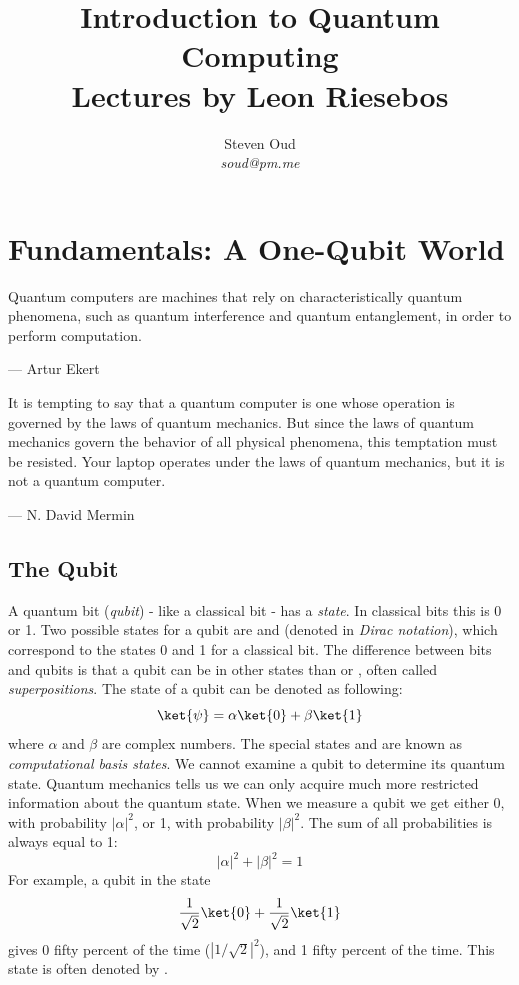 \documentclass[11pt, notitlepage]{report}
\title{\textbf{Introduction to Quantum Computing \\
\large Lectures by Leon Riesebos}}
\author{Steven Oud \\ \emph{soud@pm.me}}
\makeatletter
\newcommand*{\toccontents}{\@starttoc{toc}}
\makeatother
\begin{document}
\vfill
\maketitle

\toccontents

\newpage

\chapter{Fundamentals: A One-Qubit World}
\epigraph{Quantum computers are machines that rely on characteristically quantum phenomena, such as quantum interference and quantum entanglement, in order to perform computation.}{--- Artur Ekert}

\epigraph{It is tempting to say that a quantum computer is one whose operation is governed by the laws of quantum mechanics. But since the laws of quantum mechanics govern the behavior of all physical phenomena, this temptation must be resisted. Your laptop operates under the laws of quantum mechanics, but it is not a quantum computer.}{--- N. David Mermin}

\section{The Qubit}
A quantum bit (\emph{qubit}) - like a classical bit - has a \emph{state}. In classical bits this is 0 or 1. Two possible states for a qubit are  and  (denoted in \emph{Dirac notation}), which correspond to the states 0 and 1 for a classical bit. The difference between bits and qubits is that a qubit can be in other states than  or , often called \emph{superpositions}. The state of a qubit can be denoted as following:
\[\ket{\psi} = \alpha\ket{0} + \beta\ket{1}\]
where $\alpha$ and $\beta$ are complex numbers. The special states  and  are known as \emph{computational basis states}. We cannot examine a qubit to determine its quantum state. Quantum mechanics tells us we can only acquire much more restricted information about the quantum state. When we measure a qubit we get either 0, with probability $|\alpha|^2$, or 1, with probability $|\beta|^2$. The sum of all probabilities is always equal to 1:
\[|\alpha|^2 + |\beta|^2 = 1\]
For example, a qubit in the state
\[
\dfrac{1}{\sqrt2}\ket{0}+\dfrac{1}{\sqrt2}\ket{1}
\]
gives 0 fifty percent of the time ($|1/\sqrt2|^2$), and 1 fifty percent of the time. This state is often denoted by \ket{+}.
\end{document}
